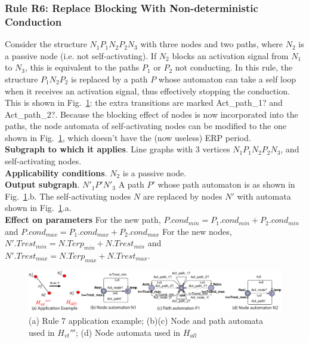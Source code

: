 \subsubsection{Rule R6: Replace Blocking With Non-deterministic Conduction}
Consider the structure $N_1 P_1 N_2 P_2 N_3$ with three nodes and two paths, where $N_2$ is a passive node (i.e. not self-activating).
If $N_2$ blocks an activation signal from $N_1$ to $N_3$, this is equivalent to the paths $P_1$ or $P_2$ not conducting.
In this rule, the structure $P_1 N_2 P_2$ is replaced by a path $P$ whose automaton can take a self loop when it receives an activation signal, thus effectively stopping the conduction. 
This is shown in Fig.~\ref{fig:rule5}: the extra transitions are marked Act\_path\_1? and Act\_path\_2?.
Because the blocking effect of nodes is now incorporated into the paths, the node automata of self-activating nodes can be modified to the one shown in Fig.~\ref{fig:rule5}, which doesn't have the (now useless) ERP period.
\\
\textbf{Subgraph to which it applies}.
Line graphs with 3 vertices $N_1 P_1 N_2 P_2 N_3$, and self-activating nodes.\\
\textbf{Applicability conditions}.
$N_2$ is a passive node.\\
\textbf{Output subgraph}.
$N'_1 P' N'_3$
A path $P'$ whose path automaton is as shown in Fig.~\ref{fig:rule5}.b.
The self-activating nodes $N$ are replaced by nodes $N'$ with automata shown in Fig.~\ref{fig:rule5}.a.\\
\textbf{Effect on parameters}
For the new path, $P.cond_{min}=P_1.cond_{min}+P_2.cond_{min}$ and 
$P.cond_{max}=P_1.cond_{max}+P_2.cond_{max}$
For the new nodes, $N'.Trest_{min}=N.Terp_{min}+N.Trest_{min}$ and 
$N'.Trest_{max}=N.Terp_{max}+N.Trest_{max}$.\\


\begin{figure}[!t]
	\centering
	\includegraphics[width=1.05\textwidth]{figs/rule5.pdf}
	\caption{\small (a) Rule 7 application example; (b)(c) Node and path automata used in $H_{vt}'''$; (d) Node automata used in $H_{all}$ }
	\label{fig:rule5}
\end{figure}

